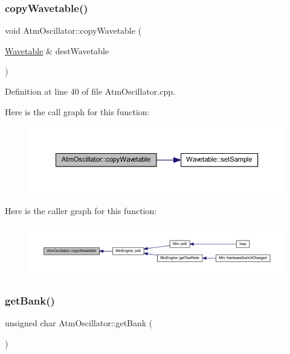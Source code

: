 \subsubsection{\texorpdfstring{copy\+Wavetable()}{copyWavetable()}}
{\footnotesize\ttfamily void Atm\+Oscillator\+::copy\+Wavetable (\begin{DoxyParamCaption}\item[{\hyperlink{class_wavetable}{Wavetable} \&}]{dest\+Wavetable }\end{DoxyParamCaption})}



Definition at line 40 of file Atm\+Oscillator.\+cpp.

Here is the call graph for this function\+:
\nopagebreak
\begin{figure}[H]
\begin{center}
\leavevmode
\includegraphics[width=350pt]{d8/d5f/class_atm_oscillator_ab0b1ab90e227ced30ddffff96bec6427_cgraph}
\end{center}
\end{figure}
Here is the caller graph for this function\+:
\nopagebreak
\begin{figure}[H]
\begin{center}
\leavevmode
\includegraphics[width=350pt]{d8/d5f/class_atm_oscillator_ab0b1ab90e227ced30ddffff96bec6427_icgraph}
\end{center}
\end{figure}
\mbox{\label{class_atm_oscillator_a56b407e4175f4625e2e0d7a6f87c2225}} 
\subsubsection{\texorpdfstring{get\+Bank()}{getBank()}}
{\footnotesize\ttfamily unsigned char Atm\+Oscillator\+::get\+Bank (\begin{DoxyParamCaption}{ }\end{DoxyParamCaption})\hspace{0.3cm}{\ttfamily [inline]}}



